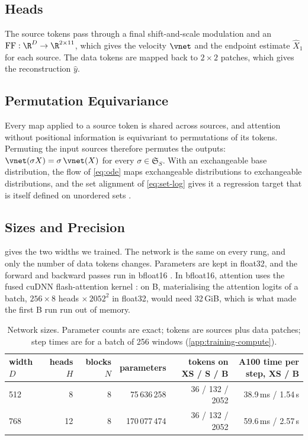 \subsection{Heads}

The source tokens pass through a final shift-and-scale modulation and an
$\mathrm{FF}:\R^D\to\R^{2\times11}$, which gives the velocity $\vnet$ and the endpoint
estimate $\hat X_1$ for each source. The data tokens are mapped back to $2\times2$ patches,
which gives the reconstruction $\hat y$.

\subsection{Permutation Equivariance}
\label{app:architecture-equivariance}

Every map applied to a source token is shared across sources, and attention without
positional information is equivariant to permutations of its tokens. Permuting the input
sources therefore permutes the outputs: $\vnet(\sigma X) = \sigma\,\vnet(X)$ for every
$\sigma\in\mathfrak S_S$. With an exchangeable base distribution, the flow of \cref{eq:ode}
maps exchangeable distributions to exchangeable distributions, and the set alignment of
\cref{eq:set-log} gives it a regression target that is itself defined on unordered sets
\citep[compare][]{zaheer2017deep,lee2019set}.

\subsection{Sizes and Precision}

 gives the two widths we trained. The network is the same on every rung,
and only the number of data tokens changes. Parameters are kept in float32, and the forward
and backward passes run in bfloat16 \citep{micikevicius2018mixed,kalamkar2019study}. In
bfloat16, attention uses the fused cuDNN flash-attention kernel \citep{dao2022flashattention}:
on B, materialising the attention logits of a batch, $256\times8$ heads $\times\,2052^2$ in
float32, would need 32\,GiB, which is what made the first B run run out of memory.

\begin{table}[h]
\caption{Network sizes. Parameter counts are exact; tokens are sources plus data patches; step times are for a batch of 256 windows (\cref{app:training-compute}).}
\label{tab:network}
\centering
\small
\begin{tabular}{lrrrrr}
\toprule
width $D$ & heads $H$ & blocks $N$ & parameters & tokens on XS / S / B & A100 time per step, XS / B \\
\midrule
512 & 8 & 8 & 75\,636\,258 & 36 / 132 / 2052 & 38.9\,ms / 1.54\,s \\
768 & 12 & 8 & 170\,077\,474 & 36 / 132 / 2052 & 59.6\,ms / 2.57\,s \\
\bottomrule
\end{tabular}
\end{table}

